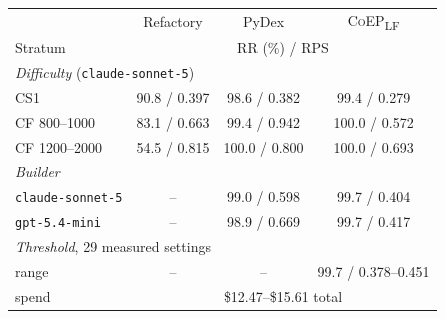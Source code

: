\begin{tabular}{@{}l@{\hskip 4pt}ccc@{}}
\toprule
& Refactory & PyDex & \textsc{CoEP}\textsubscript{LF} \\
Stratum & \multicolumn{3}{c}{RR (\%) / RPS} \\
\midrule
\multicolumn{4}{l}{\emph{Difficulty} (\texttt{claude-sonnet-5})}\\
\quad CS1 & 90.8 / 0.397 & 98.6 / 0.382 & 99.4 / 0.279 \\
\quad CF 800--1000 & 83.1 / 0.663 & 99.4 / 0.942 & 100.0 / 0.572 \\
\quad CF 1200--2000 & 54.5 / 0.815 & 100.0 / 0.800 & 100.0 / 0.693 \\
\midrule
\multicolumn{4}{l}{\emph{Builder}}\\
\quad \texttt{claude-sonnet-5} & -- & 99.0 / 0.598 & 99.7 / 0.404 \\
\quad \texttt{gpt-5.4-mini} & -- & 98.9 / 0.669 & 99.7 / 0.417 \\
\midrule
\multicolumn{4}{l}{\emph{Threshold}, 29 measured settings}\\
\quad range & -- & -- & 99.7 / 0.378--0.451 \\
\quad spend & \multicolumn{3}{c}{\$12.47--\$15.61 total} \\
\bottomrule
\end{tabular}
